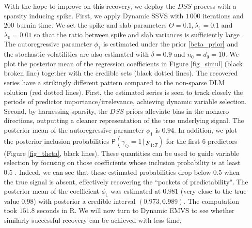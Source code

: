 \documentclass[ba]{imsart}
\numberwithin{equation}{section}
\theoremstyle{plain}
\def\y{\mbox{\boldmath$y$}}
\newcommand{\bm}[1]{\boldsymbol{#1}}
\renewcommand{\P}{\mathsf{P}}
\def\C {\,|\:}
\def\C {\,|\:}
\def\y{\bm{y}}
\begin{document}
{With the hope to improve on this recovery, we deploy the $DSS$ process with a sparsity inducing spike. First, we apply Dynamic SSVS  with $1\,000$ iterations and $200$ burnin time. We set the spike and slab parameters $\Theta=0.1,\lambda_1=0.1$ and $\lambda_0=0.01$ so that the ratio between spike and slab variances is sufficiently large \citep{GM93}.
 The autoregressive parameter $\phi_1$ is estimated under the prior \eqref{beta_prior} and the stochastic volatilities are also estimated with $\delta=0.9$ and $n_0=d_0=10$.
 We plot the posterior mean of the regression coefficients in Figure \ref{fig_simul} (black broken line) together with the credible sets (black dotted lines).
 The recovered series have a strikingly different pattern compared to the non-sparse DLM solution (red dotted lines). First, the estimated series is seen to track closely the periods of predictor importance/irrelevance, achieving dynamic variable selection. Second, by harnessing sparsity, the $DSS$ priors alleviate bias in the nonzero directions, outputting a  cleaner representation of the true underlying signal. The posterior mean of the autoregressive parameter $\phi_1$ is $0.94$. In addition, we  plot the posterior inclusion probabilities $\P(\gamma_{tj}=1\C \y_{1:T})$ for the first $6$ predictors (Figure \ref{fig_theta}, black lines). These quantities can be used to guide variable selection by focusing on those coefficients whose inclusion probability is at least $0.5$ \citep{barbieri}. Indeed, we can see that these estimated probabilities drop below $0.5$ when the true signal is absent, effectively recovering the ``pockets of predictability". The posterior mean of the coefficient $\phi_1$ was estimated at $0.981$ (very close to the true value $0.98$) with posterior a credible interval $(0.973,0.989)$.  The computation  took $151.8$ seconds in R.  We will now turn to Dynamic EMVS to see whether similarly successful recovery can be achieved with less time. 

}
\end{document}
